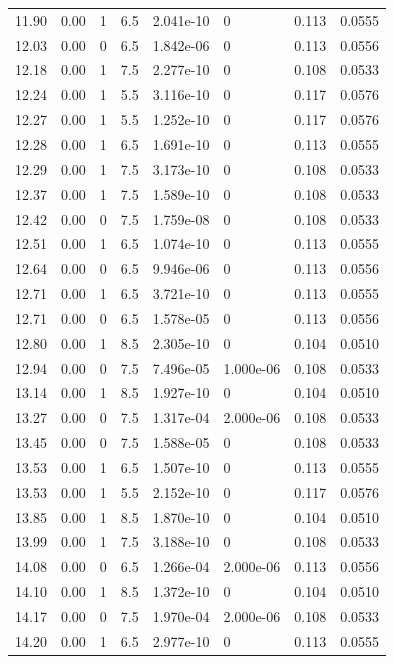 \documentclass[preview]{standalone}
\begin{document}
{{{\begin{tabular}{L{1.2cm}C{1.2cm} C{0.3cm}C{0.5cm} C{1.4cm}C{1.4cm} C{1.4cm}C{1.4cm}}
  11.90  &  0.00  & 1     & 6.5 &  2.041e-10  & 0  & 0.113 &  0.0555   \\ 
  12.03  &  0.00  & 0     & 6.5 &  1.842e-06  & 0  & 0.113 &  0.0556   \\ 
  12.18  &  0.00  & 1     & 7.5 &  2.277e-10  & 0  & 0.108 &  0.0533   \\ 
  12.24  &  0.00  & 1     & 5.5 &  3.116e-10  & 0  & 0.117 &  0.0576   \\ 
  12.27  &  0.00  & 1     & 5.5 &  1.252e-10  & 0  & 0.117 &  0.0576   \\ 
  12.28  &  0.00  & 1     & 6.5 &  1.691e-10  & 0  & 0.113 &  0.0555   \\ 
  12.29  &  0.00  & 1     & 7.5 &  3.173e-10  & 0  & 0.108 &  0.0533   \\ 
  12.37  &  0.00  & 1     & 7.5 &  1.589e-10  & 0  & 0.108 &  0.0533   \\ 
  12.42  &  0.00  & 0     & 7.5 &  1.759e-08  & 0  & 0.108 &  0.0533   \\ 
  12.51  &  0.00  & 1     & 6.5 &  1.074e-10  & 0  & 0.113 &  0.0555   \\ 
  12.64  &  0.00  & 0     & 6.5 &  9.946e-06  & 0  & 0.113 &  0.0556   \\ 
  12.71  &  0.00  & 1     & 6.5 &  3.721e-10  & 0  & 0.113 &  0.0555   \\ 
  12.71  &  0.00  & 0     & 6.5 &  1.578e-05  & 0  & 0.113 &  0.0556   \\ 
  12.80  &  0.00  & 1     & 8.5 &  2.305e-10  & 0  & 0.104 &  0.0510   \\ 
  12.94  &  0.00  & 0     & 7.5 &  7.496e-05  & 1.000e-06  & 0.108 &  0.0533   \\ 
  13.14  &  0.00  & 1     & 8.5 &  1.927e-10  & 0  & 0.104 &  0.0510   \\ 
  13.27  &  0.00  & 0     & 7.5 &  1.317e-04  & 2.000e-06  & 0.108 &  0.0533   \\ 
  13.45  &  0.00  & 0     & 7.5 &  1.588e-05  & 0  & 0.108 &  0.0533   \\ 
  13.53  &  0.00  & 1     & 6.5 &  1.507e-10  & 0  & 0.113 &  0.0555   \\ 
  13.53  &  0.00  & 1     & 5.5 &  2.152e-10  & 0  & 0.117 &  0.0576   \\ 
  13.85  &  0.00  & 1     & 8.5 &  1.870e-10  & 0  & 0.104 &  0.0510   \\ 
  13.99  &  0.00  & 1     & 7.5 &  3.188e-10  & 0  & 0.108 &  0.0533   \\ 
  14.08  &  0.00  & 0     & 6.5 &  1.266e-04  & 2.000e-06  & 0.113 &  0.0556   \\ 
  14.10  &  0.00  & 1     & 8.5 &  1.372e-10  & 0  & 0.104 &  0.0510   \\ 
  14.17  &  0.00  & 0     & 7.5 &  1.970e-04  & 2.000e-06  & 0.108 &  0.0533   \\ 
  14.20  &  0.00  & 1     & 6.5 &  2.977e-10  & 0  & 0.113 &  0.0555   \\ 
\hline 
\end{tabular} 

}}}
\end{document}
